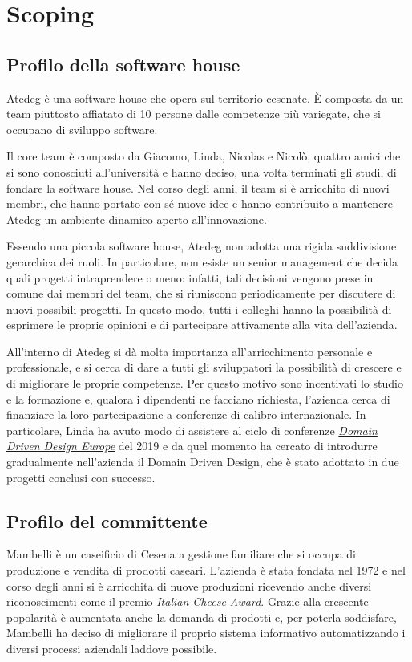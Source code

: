 \chapter{Scoping}\label{ch:scoping}

\section{Profilo della software house}\label{sec:profilo-della-software-house}
Atedeg è una software house che opera sul territorio cesenate. È composta da un team piuttosto affiatato di 10 persone dalle competenze più variegate, che si occupano di sviluppo software.

Il core team è composto da Giacomo, Linda, Nicolas e Nicolò, quattro amici che si sono conosciuti all'università e hanno deciso, una volta terminati gli studi, di fondare la software house.
Nel corso degli anni, il team si è arricchito di nuovi membri, che hanno portato con sé nuove idee e hanno contribuito a mantenere Atedeg un ambiente dinamico aperto all'innovazione.

Essendo una piccola software house, Atedeg non adotta una rigida suddivisione gerarchica dei ruoli. In particolare, non esiste un senior management che decida quali progetti intraprendere o meno: infatti, tali decisioni vengono prese in comune dai membri del team, che si riuniscono periodicamente per discutere di nuovi possibili progetti. In questo modo, tutti i colleghi hanno la possibilità di esprimere le proprie opinioni e di partecipare attivamente alla vita dell'azienda.

All'interno di Atedeg si dà molta importanza all'arricchimento personale e professionale, e si cerca di dare a tutti gli sviluppatori la possibilità di crescere e di migliorare le proprie competenze. Per questo motivo sono incentivati lo studio e la formazione e, qualora i dipendenti ne facciano richiesta, l'azienda cerca di finanziare la loro partecipazione a conferenze di calibro internazionale.
In particolare, Linda ha avuto modo di assistere al ciclo di conferenze \href{https://dddeurope.com}{\emph{Domain Driven Design Europe}} del 2019 e da quel momento ha cercato di introdurre gradualmente nell'azienda il Domain Driven Design, che è stato adottato in due progetti conclusi con successo.

\section{Profilo del committente}\label{sec:profilo-del-committente}
Mambelli è un caseificio di Cesena a gestione familiare che si occupa di produzione e vendita di prodotti caseari. L'azienda è stata fondata nel 1972 e nel corso degli anni si è arricchita di nuove produzioni ricevendo anche diversi riconoscimenti come il premio \emph{Italian Cheese Award}.
Grazie alla crescente popolarità è aumentata anche la domanda di prodotti e, per poterla soddisfare, Mambelli ha deciso di migliorare il proprio sistema informativo automatizzando i diversi processi aziendali laddove possibile.

